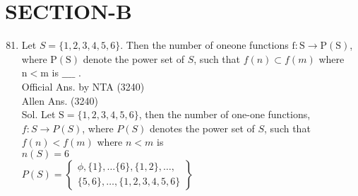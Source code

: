 \documentclass[10pt]{article}
\begin{document}
\section*{SECTION-B}
\begin{enumerate}
  \setcounter{enumi}{80}
  \item Let \(S=\{1,2,3,4,5,6\}\). Then the number of oneone functions \(\mathrm{f}: \mathrm{S} \rightarrow \mathrm{P}(\mathrm{S})\), where \(\mathrm{P}(\mathrm{S})\) denote the power set of \(S\), such that \(f(n) \subset f(m)\) where \(\mathrm{n}<\mathrm{m}\) is \(\_\_\_\_\) .\\
Official Ans. by NTA (3240)\\
Allen Ans. (3240)\\
Sol. Let \(\mathrm{S}=\{1,2,3,4,5,6\}\), then the number of one-one functions, \(f: S \rightarrow P(S)\), where \(P(S)\) denotes the power set of \(S\), such that \(f(n)<f(m)\) where \(n<m\) is\\
\(n(S)=6\)\\
\(P(S)=\left\{\begin{array}{c}\phi,\{1\}, \ldots\{6\},\{1,2\}, \ldots, \\ \{5,6\}, \ldots,\{1,2,3,4,5,6\}\end{array}\right\}\)
\end{enumerate}
\end{document}
